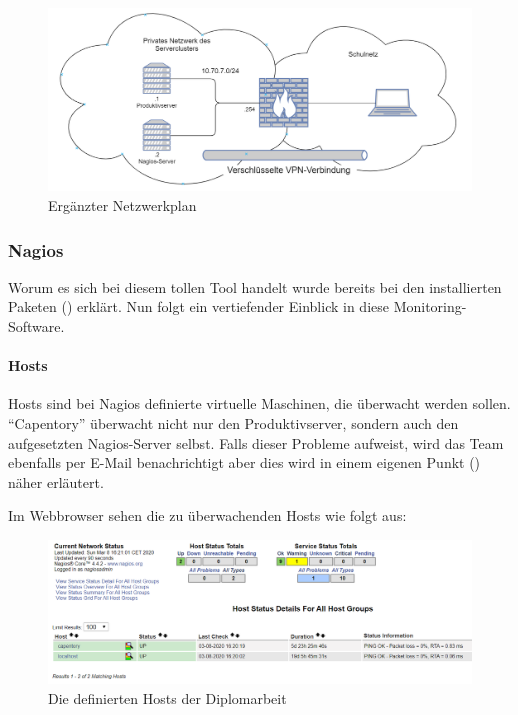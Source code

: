 \begin{figure}[ht]
\centering
\includegraphics{neutopo.png}
\caption{Ergänzter Netzwerkplan}
\end{figure}

\hypertarget{nagios-1}{%
\subsubsection{Nagios}\label{nagios-1}}

Worum es sich bei diesem tollen Tool handelt wurde bereits bei den
installierten Paketen () erklärt. Nun folgt ein
vertiefender Einblick in diese Monitoring-Software.

\hypertarget{hosts}{%
\paragraph{Hosts}\label{hosts}}

Hosts sind bei Nagios definierte virtuelle Maschinen, die überwacht
werden sollen. ``Capentory'' überwacht nicht nur den Produktivserver,
sondern auch den aufgesetzten Nagios-Server selbst. Falls dieser
Probleme aufweist, wird das Team ebenfalls per E-Mail benachrichtigt
aber dies wird in einem eigenen Punkt () näher
erläutert.

Im Webbrowser sehen die zu überwachenden Hosts wie folgt aus:

\begin{figure}[ht]
\centering
\includegraphics{hosts.png}
\caption{Die definierten Hosts der Diplomarbeit}
\end{figure}

